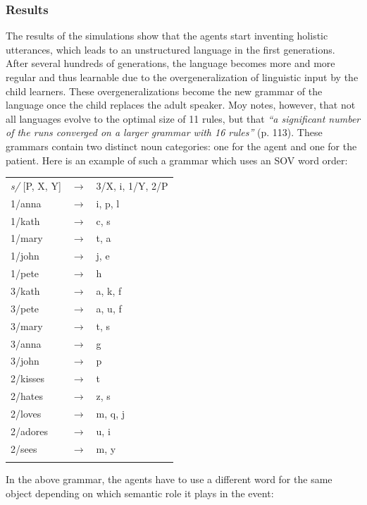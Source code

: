 \subsubsection{Results}
The results of the simulations show that the agents start inventing holistic utterances, which leads to an unstructured language in the first generations. After several hundreds of generations, the language becomes more and more regular and thus learnable due to the overgeneralization of linguistic input by the child learners. These overgeneralizations become the new grammar of the language once the child replaces the adult speaker. Moy notes, however, that not all languages evolve to the optimal size of 11 rules, but that {\em ``a significant number of the runs converged on a larger grammar with 16 rules''} (p. 113). These grammars contain two distinct noun categories: one for the agent and one for the patient. Here is an example of such a grammar which uses an SOV word order:

\ea
\label{g:moy-grammar}
\begin{tabular}{l c l}
{\em s/} [P, X, Y] & $\rightarrow$  & 3/X, i, 1/Y, 2/P
\\ 1/anna & $\rightarrow$ & i, p, l
\\ 1/kath & $\rightarrow$ & c, s
\\ 1/mary & $\rightarrow$ & t, a
\\ 1/john & $\rightarrow$ & j, e
\\ 1/pete & $\rightarrow$ & h
\\ 3/kath & $\rightarrow$ & a, k, f
\\ 3/pete & $\rightarrow$ & a, u, f
\\ 3/mary & $\rightarrow$ & t, s
\\ 3/anna & $\rightarrow$ & g
\\ 3/john & $\rightarrow$ & p
\\ 2/kisses & $\rightarrow$ & t
\\ 2/hates & $\rightarrow$ & z, s
\\ 2/loves & $\rightarrow$ & m, q, j
\\ 2/adores&  $\rightarrow$ & u, i
\\ 2/sees & $\rightarrow$ & m, y
\\ \citep[p. 113]{moy06case}
\end{tabular}
\z

In the above grammar, the agents have to use a different word for the same object depending on which semantic role it plays in the event:

